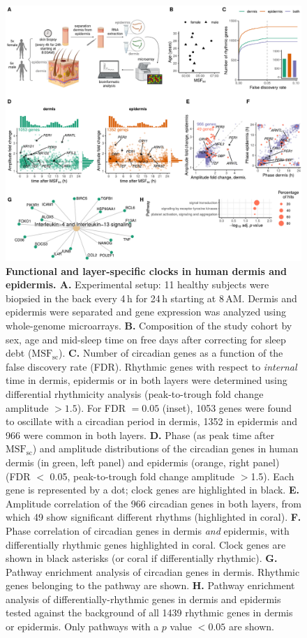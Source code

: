 \begin{figure}[hb!]
	\begin{center}
		\includegraphics[scale=0.55]{./Figures/fig1_complete.pdf}
		\caption{\textbf{Functional and layer-specific clocks in human dermis and epidermis. A.} Experimental setup: 11 healthy subjects were biopsied in the back every 4\,h for 24\,h starting at 8\,AM. Dermis and epidermis were separated and gene expression was analyzed using whole-genome microarrays.\textbf{ B. }Composition of the study cohort by sex, age and mid-sleep time on free days after correcting for sleep debt ($\textrm{MSF}_\textrm{sc}$). \textbf{C.} Number of circadian genes as a function of the false discovery rate (FDR). Rhythmic genes with respect to \textit{internal} time in dermis, epidermis or in both layers were determined using differential rhythmicity analysis (peak-to-trough fold change amplitude $>1.5$). For FDR $=0.05$ (inset), 1053 genes were found to oscillate with a circadian period in dermis, 1352 in epidermis and 966 were common in both layers. \textbf{D. }Phase (as peak time after $\textrm{MSF}_\textrm{sc}$) and amplitude distributions of the circadian genes in human dermis (in green, left panel) and epidermis (orange, right panel) (FDR $<$ 0.05, peak-to-trough fold change amplitude $>$1.5). Each gene is represented by a dot; clock genes are highlighted in black. \textbf{E. }Amplitude correlation of the 966 circadian genes in both layers, from which 49 show significant different rhythms (highlighted in coral). \textbf{F. }Phase correlation of circadian genes in dermis \textit{and} epidermis, with differentially rhythmic genes highlighted in coral. Clock genes are shown in black asterisks (or coral if differentially rhythmic). \textbf{G.} Pathway enrichment analysis of circadian genes in dermis. Rhythmic genes belonging to the pathway are shown. \textbf{H.} Pathway enrichment analysis of differentially-rhythmic genes in dermis and epidermis tested against the background of all 1439 rhythmic genes in dermis or epidermis. Only pathways with a $p$ value $<0.05$ are shown.} 

\end{center}
\end{figure}
